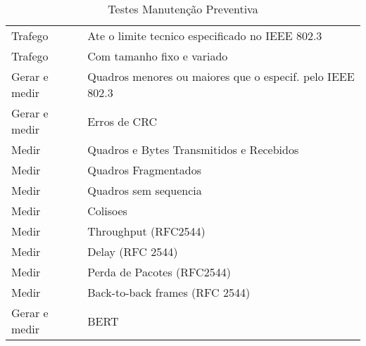 \begin{table}[h!]
\centering
\caption{Testes Manutenção Preventiva}
\label{my-label}
\begin{tabular}{ll}
Trafego                                    & Ate o limite tecnico especificado no IEEE 802.3               \\
Trafego                                    & Com tamanho fixo e variado                                    \\
Gerar e medir                              & Quadros menores ou maiores que o especif.  pelo IEEE 802.3    \\
Gerar e medir                              & Erros de CRC                                                  \\
Medir                                      & Quadros e Bytes Transmitidos e Recebidos                      \\
Medir                                      & Quadros Fragmentados                                          \\
Medir                                      & Quadros sem sequencia                                         \\
Medir                                      & Colisoes                                                      \\
Medir                                      & Throughput (RFC2544)                                          \\
Medir                                      & Delay (RFC 2544)                                              \\
Medir                                      & Perda de Pacotes (RFC2544)                                    \\
Medir                                      & Back-to-back frames (RFC 2544)                                \\
Gerar e medir                              & BERT                                                          \\  
\end{tabular}
\end{table}